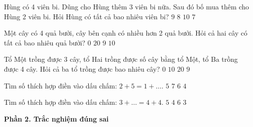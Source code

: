 \begin{ex} %
Hùng có 4 viên bi. Dũng cho Hùng thêm 3 viên bi nữa. Sau đó bố mua thêm cho Hùng 2 viên bi. Hỏi Hùng có tất cả bao nhiêu viên bi?
\choice
{\True $9$}
{$8$}
{$10$}
{$7$}
\end{ex}

\begin{ex} %
Một cây có 4 quả bưởi, cây bên cạnh có nhiều hơn 2 quả bưởi. Hỏi cả hai cây có tất cả bao nhiêu quả bưởi?
\choice
{$0$}
{$20$}
{$9$}
{\True $10$}
\end{ex}

\begin{ex} %
Tổ Một trồng được 3 cây, tổ Hai trồng được số cây bằng tổ Một, tổ Ba trồng được 4 cây. Hỏi cả ba tổ trồng được bao nhiêu cây?
\choice
{$0$}
{\True $10$}
{$20$}
{$9$}
\end{ex}

\begin{ex} %
Tìm số thích hợp điền vào dấu chấm: $2 + 5 = 1 + \dots$.
\choice
{$5$}
{$7$}
{\True $6$}
{$4$}
\end{ex}

\begin{ex} %
Tìm số thích hợp điền vào dấu chấm: $3 + \dots = 4 + 4$.
\choice
{\True $5$}
{$4$}
{$6$}
{$3$}
\end{ex}

\textbf{Phần 2. Trắc nghiệm đúng sai}

